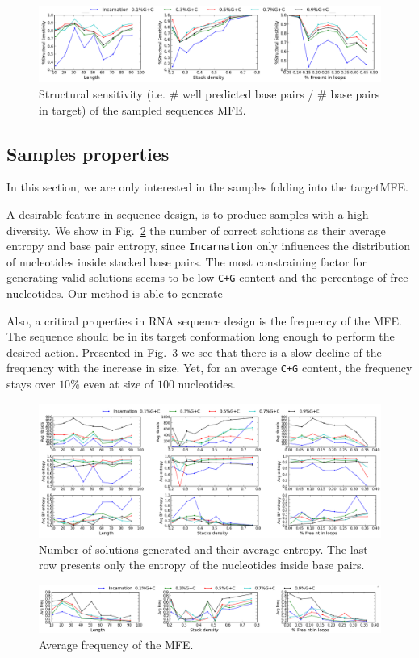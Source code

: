 \begin{figure}[ht!]
 	\centering
	\includegraphics[scale=0.45]{Figures/rnastrand_clustered_rnainverse_100samples_struct_sens.png}
	\caption{Structural sensitivity (i.e. $\#$ well predicted base pairs / $\#$ base pairs in target) of the sampled sequences MFE. }
	\label{fig:ss_sens}	
\end{figure}


\subsection{Samples properties}

In this section, we are only interested  in the samples folding into the 
targetMFE. 

A desirable feature in sequence design, is to produce samples with a high
diversity. We show in Fig.~\ref{fig:nb_sols_entropy} the number of correct
solutions as their average entropy and base pair entropy, since 
\texttt{Incarnation}  only influences the distribution of nucleotides inside 
stacked base pairs. The most constraining factor for generating valid
 solutions seems to be  low \texttt{C+G} content and the percentage of free nucleotides. Our method is able to generate 

Also, a critical properties in RNA sequence design is 
the frequency of the MFE. 
The sequence should be in its target conformation long enough to
perform the desired action. Presented in Fig.~\ref{fig:freq} we see that
there is a slow decline of the frequency with the increase in size. Yet,
for an average \texttt{C+G} content, the frequency stays over $10\%$ even
at size of $100$ nucleotides.


\begin{figure}[ht!]
	\centering
	\includegraphics[width=\textwidth]{Figures/nb_sols_entropy.png}
	\caption{Number of solutions generated and their average entropy. 
	The last row presents only the entropy of the nucleotides inside base 
	pairs.}
	\label{fig:nb_sols_entropy}
\end{figure}



\begin{figure}[ht!]
	\centering
	\includegraphics[width=\textwidth]{Figures/freq.png}
	\caption{Average frequency of the MFE.}
	\label{fig:freq}
\end{figure}

